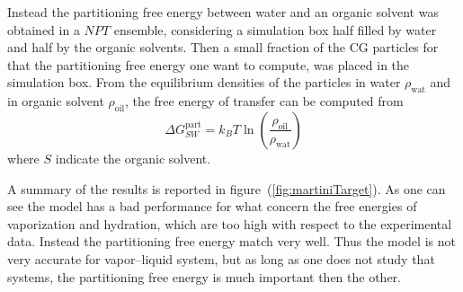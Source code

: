 Instead the partitioning free energy between water and an organic solvent was obtained in a $NPT$ ensemble, considering a simulation box half filled by water and half by the organic solvents. Then a small fraction of the \ac{CG} particles for that the partitioning free energy one want to compute, was placed in the simulation box. From the equilibrium densities of the particles in water $\rho_{\text{wat}}$ and in organic solvent $\rho_{\text{oil}}$, the free energy of transfer can be computed from
\begin{equation*}
	\Delta G_{SW}^{\text{part}} = k_B T \ln \left ( \frac{\rho_{\text{oil}}}{\rho_{\text{wat}}}\right )
\end{equation*}
where $S$ indicate the organic solvent.

A summary of the results is reported in figure~(\ref{fig:martiniTarget}). As one can see the model has a bad performance for what concern the free energies of vaporization and hydration, which are too high with respect to the experimental data. Instead the partitioning free energy match very well. Thus the model is not very accurate for vapor--liquid system, but as long as one does not study that systems, the partitioning free energy is much important then the other.

